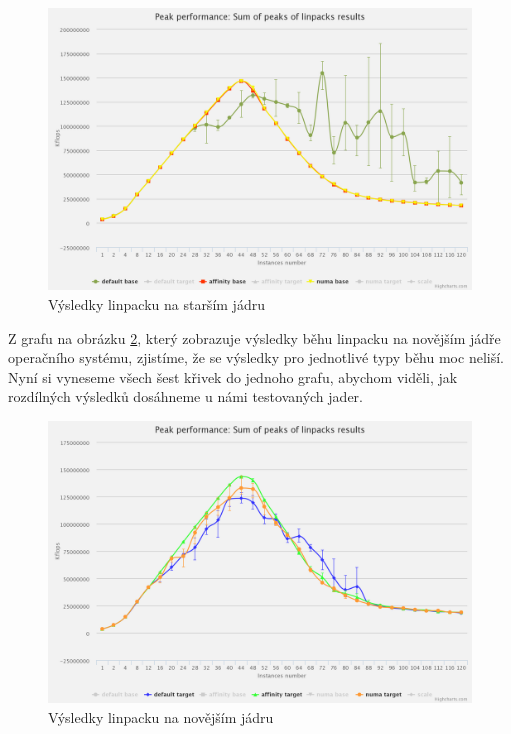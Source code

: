 \documentclass[
  master=true,
  font=sans,
  printversion=false,
  joinlists=true,
  figures=true,
  tables=true,
  sourcecodes=false,
  theorems=false,
  bibencoding=utf8,
  language=czech,
  encoding=utf8,
  field=ainfk,
  biblatex,
  glossaries,
  index
]{kidiplom}
\begin{document}
\begin{figure}[ht]
\center
\includegraphics[scale=0.174]{obrazky/LinpackBaseChart.png}
\caption{Výsledky linpacku na starším jádru}
\label{older kernel linpack results}
\end{figure}

Z grafu na obrázku \ref{newer kernel linpack results}, který zobrazuje výsledky běhu linpacku na novějším jádře operačního systému,  zjistíme, že se výsledky pro jednotlivé typy běhu moc neliší. Nyní si vyneseme všech šest křivek do jednoho grafu, abychom viděli, jak rozdílných výsledků dosáhneme u námi testovaných jader. 

\begin{figure}[ht]
\center
\includegraphics[scale=0.174]{obrazky/LinpackTargetChart.png}
\caption{Výsledky linpacku na novějším jádru}
\label{newer kernel linpack results}
\end{figure}
\end{document}
